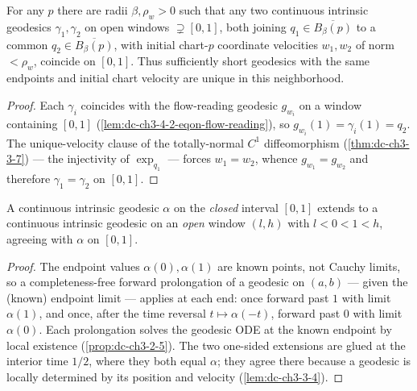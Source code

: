 \begin{lemma}
  \label{lem:dc-ch3-4-2-uniqueness-engine}


  For any $p$ there are radii $\beta,\rho_w>0$ such that any two continuous intrinsic geodesics
  $\gamma_1,\gamma_2$ on open windows $\supsetneq[0,1]$, both joining $q_1\in\overline{B_\beta(p)}$ to
  a common $q_2\in\overline{B_\beta(p)}$, with initial chart-$p$ coordinate velocities $w_1,w_2$ of
  norm $<\rho_w$, coincide on $[0,1]$. Thus sufficiently short geodesics with
  the same endpoints and initial chart velocity are unique in this neighborhood.
\end{lemma}
\begin{proof}
  \sketch

  Each $\gamma_i$ coincides with the flow-reading geodesic $g_{w_i}$ on a window containing $[0,1]$
  (\cref{lem:dc-ch3-4-2-eqon-flow-reading}), so $g_{w_i}(1)=\gamma_i(1)=q_2$. The unique-velocity
  clause of the totally-normal $C^1$ diffeomorphism (\cref{thm:dc-ch3-3-7}) --- the injectivity
  of $\exp_{q_1}$ --- forces $w_1=w_2$, whence $g_{w_1}=g_{w_2}$ and therefore $\gamma_1=\gamma_2$ on
  $[0,1]$.
\end{proof}

\begin{lemma}
  \label{lem:dc-ch3-4-2-window}


  A continuous intrinsic geodesic $\alpha$ on the \emph{closed} interval $[0,1]$ extends to a
  continuous intrinsic geodesic on an \emph{open} window $(l,h)$ with $l<0<1<h$, agreeing with
  $\alpha$ on $[0,1]$.
\end{lemma}
\begin{proof}
  \sketch

  The endpoint values $\alpha(0),\alpha(1)$ are known points, not Cauchy limits, so a
  completeness-free forward prolongation of a geodesic on $(a,b)$ --- given the (known) endpoint
  limit --- applies at each end: once forward past $1$ with limit $\alpha(1)$, and once, after the
  time reversal $t\mapsto\alpha(-t)$, forward past $0$ with limit $\alpha(0)$. Each prolongation
  solves the geodesic ODE at the known endpoint by local existence (\cref{prop:dc-ch3-2-5}). The two
  one-sided extensions are glued at the interior time $1/2$, where they both equal $\alpha$; they
  agree there because a geodesic is locally determined by its position and velocity
  (\cref{lem:dc-ch3-3-4}).
\end{proof}

